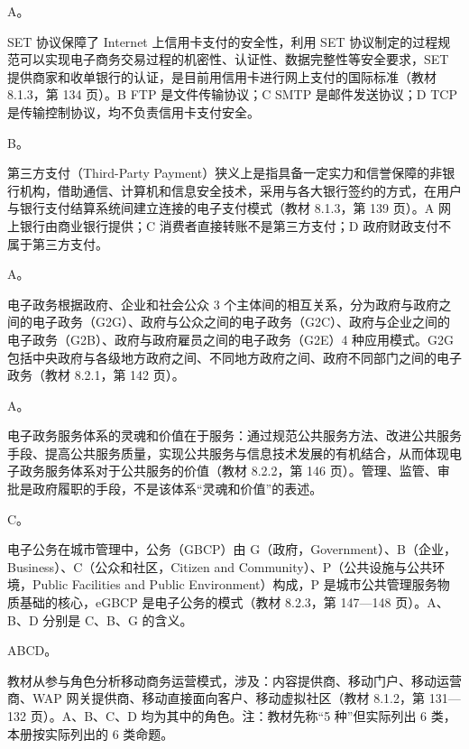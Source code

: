 \documentclass[a4paper,11pt]{article}
\begin{document}
\q A。\begin{analysis}SET 协议保障了 Internet 上信用卡支付的安全性，利用 SET 协议制定的过程规范可以实现电子商务交易过程的机密性、认证性、数据完整性等安全要求，SET 提供商家和收单银行的认证，是目前用信用卡进行网上支付的国际标准（教材 8.1.3，第 134 页）。B FTP 是文件传输协议；C SMTP 是邮件发送协议；D TCP 是传输控制协议，均不负责信用卡支付安全。\end{analysis}

\q B。\begin{analysis}第三方支付（Third-Party Payment）狭义上是指具备一定实力和信誉保障的非银行机构，借助通信、计算机和信息安全技术，采用与各大银行签约的方式，在用户与银行支付结算系统间建立连接的电子支付模式（教材 8.1.3，第 139 页）。A 网上银行由商业银行提供；C 消费者直接转账不是第三方支付；D 政府财政支付不属于第三方支付。\end{analysis}

\q A。\begin{analysis}电子政务根据政府、企业和社会公众 3 个主体间的相互关系，分为政府与政府之间的电子政务（G2G）、政府与公众之间的电子政务（G2C）、政府与企业之间的电子政务（G2B）、政府与政府雇员之间的电子政务（G2E）4 种应用模式。G2G 包括中央政府与各级地方政府之间、不同地方政府之间、政府不同部门之间的电子政务（教材 8.2.1，第 142 页）。\end{analysis}

\q A。\begin{analysis}电子政务服务体系的灵魂和价值在于服务：通过规范公共服务方法、改进公共服务手段、提高公共服务质量，实现公共服务与信息技术发展的有机结合，从而体现电子政务服务体系对于公共服务的价值（教材 8.2.2，第 146 页）。管理、监管、审批是政府履职的手段，不是该体系“灵魂和价值”的表述。\end{analysis}

\q C。\begin{analysis}电子公务在城市管理中，公务（GBCP）由 G（政府，Government）、B（企业，Business）、C（公众和社区，Citizen and Community）、P（公共设施与公共环境，Public Facilities and Public Environment）构成，P 是城市公共管理服务物质基础的核心，eGBCP 是电子公务的模式（教材 8.2.3，第 147—148 页）。A、B、D 分别是 C、B、G 的含义。\end{analysis}


\q ABCD。\begin{analysis}教材从参与角色分析移动商务运营模式，涉及：内容提供商、移动门户、移动运营商、WAP 网关提供商、移动直接面向客户、移动虚拟社区（教材 8.1.2，第 131—132 页）。A、B、C、D 均为其中的角色。注：教材先称“5 种”但实际列出 6 类，本册按实际列出的 6 类命题。\end{analysis}
\end{document}
